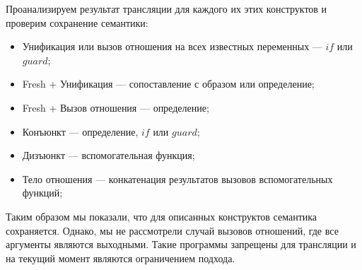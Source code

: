 Проанализируем результат трансляции для каждого их этих конструктов и проверим сохранение семантики:
\begin{itemize}
    \item Унификация или вызов отношения на всех известных переменных --- $if$ или $guard$;
    \item Fresh + Унификация --- сопоставление с образом или определение;
    \item Fresh + Вызов отношения --- определение;
    \item Конъюнкт --- определение, $if$ или $guard$;
    \item Дизъюнкт --- вспомогательная функция;
    \item Тело отношения --- конкатенация результатов вызовов вспомогательных функций;
\end{itemize}

Таким образом мы показали, что для описанных конструктов семантика сохраняется.
Однако, мы не рассмотрели случай вызовов отношений, где все аргументы являются выходными.
Такие программы запрещены для трансляции и на текущий момент являются ограничением подхода.